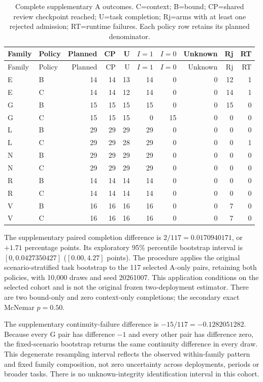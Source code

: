 \documentclass[11pt,a4paper]{article}
\begin{document}
\begin{longtable}{@{}llrrrrrrrr@{}}
\caption{Complete supplementary A outcomes. C=context; B=bound; CP=shared review checkpoint reached; U=task completion; Rj=arms with at least one rejected admission; RT=runtime failures. Each policy row retains its planned denominator.}\label{tab:supplementary-outcomes}\\
\toprule
Family & Policy & Planned & CP & U & $I=1$ & $I=0$ & Unknown & Rj & RT\\
\midrule\endfirsthead
\toprule
Family & Policy & Planned & CP & U & $I=1$ & $I=0$ & Unknown & Rj & RT\\
\midrule\endhead
E & B & 14 & 14 & 13 & 14 & 0 & 0 & 12 & 1 \\
E & C & 14 & 14 & 12 & 14 & 0 & 0 & 14 & 1 \\
G & B & 15 & 15 & 15 & 15 & 0 & 0 & 15 & 0 \\
G & C & 15 & 15 & 15 & 0 & 15 & 0 & 0 & 0 \\
L & B & 29 & 29 & 29 & 29 & 0 & 0 & 0 & 0 \\
L & C & 29 & 29 & 28 & 29 & 0 & 0 & 0 & 1 \\
N & B & 29 & 29 & 29 & 29 & 0 & 0 & 0 & 0 \\
N & C & 29 & 29 & 29 & 29 & 0 & 0 & 0 & 0 \\
R & B & 14 & 14 & 14 & 14 & 0 & 0 & 0 & 0 \\
R & C & 14 & 14 & 14 & 14 & 0 & 0 & 0 & 0 \\
V & B & 16 & 16 & 16 & 16 & 0 & 0 & 7 & 0 \\
V & C & 16 & 16 & 16 & 16 & 0 & 0 & 7 & 0 \\
\bottomrule\end{longtable}

The supplementary paired completion difference is $2/117=0.0170940171$, or $+1.71$ percentage points. Its exploratory 95\% percentile bootstrap interval is $[0,0.0427350427]$ ($[0.00,4.27]$ points). The procedure applies the original scenario-stratified task bootstrap to the 117 selected A-only pairs, retaining both policies, with 10,000 draws and seed 20261007. This application conditions on the selected cohort and is not the original frozen two-deployment estimator. There are two bound-only and zero context-only completions; the secondary exact McNemar $p=0.50$.

The supplementary continuity-failure difference is $-15/117=-0.1282051282$. Because every G pair has difference $-1$ and every other pair has difference zero, the fixed-scenario bootstrap returns the same continuity difference in every draw. This degenerate resampling interval reflects the observed within-family pattern and fixed family composition, not zero uncertainty across deployments, periods or broader tasks. There is no unknown-integrity identification interval in this cohort.
\end{document}
